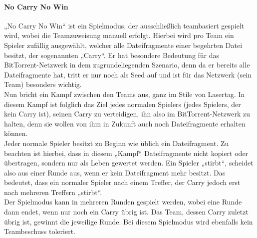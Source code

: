 \paragraph{No Carry No Win}
„No Carry No Win“ ist ein Spielmodus, der ausschließlich teambasiert gespielt wird, wobei die Teamzuweisung manuell erfolgt. Hierbei wird pro Team ein Spieler zufällig ausgewählt, welcher alle Dateifragmente einer begehrten Datei besitzt, der sogenannten „Carry“. Er hat besondere Bedeutung für das BitTorrent-Netzwerk in dem zugrundeliegenden Szenario, denn da er bereits alle Dateifragmente hat, tritt er nur noch als Seed auf und ist für das Netzwerk (sein Team) besonders wichtig. \\
Nun bricht ein Kampf zwischen den Teams aus, ganz im Stile von Lasertag. In diesem Kampf ist folglich das Ziel jedes normalen Spielers (jedes Spielers, der kein Carry ist), seinen Carry zu verteidigen, ihn also im BitTorrent-Netzwerk zu halten, denn sie wollen von ihm in Zukunft auch noch Dateifragmente erhalten können. \\
Jeder normale Spieler besitzt zu Beginn wie üblich ein Dateifragment. Zu beachten ist hierbei, dass in diesem „Kampf“ Dateifragmente nicht kopiert oder übertragen, sondern nur als Leben gewertet werden. Ein Spieler „stirbt“, scheidet also aus einer Runde aus, wenn er kein Dateifragment mehr besitzt. Das bedeutet, dass ein normaler Spieler nach einem Treffer, der Carry jedoch erst nach mehreren Treffern „stirbt“. \\
Der Spielmodus kann in mehreren Runden gespielt werden, wobei eine Runde dann endet, wenn nur noch ein Carry übrig ist. Das Team, dessen Carry zuletzt übrig ist, gewinnt die jeweilige Runde.
Bei diesem Spielmodus wird ebenfalls kein Teambeschuss toleriert.

